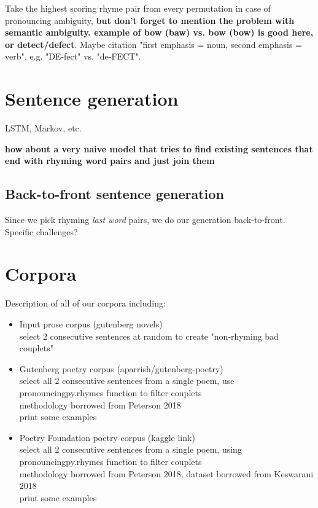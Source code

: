 \documentclass[11pt,a4paper]{article}
\begin{document}
Take the highest scoring rhyme pair from every permutation in case of pronouncing ambiguity, \textbf{but don't forget to mention the problem with semantic ambiguity. example of bow (baw) vs. bow (bow) is good here, or detect/defect}. Maybe citation "first emphasis = noun, second emphasis = verb", e.g. "DE-fect" vs. "de-FECT".

\section{Sentence generation}
\label{sec:languagegen}

LSTM, Markov, etc.

\textbf{how about a very naive model that tries to find existing sentences that end with rhyming word pairs and just join them}

\subsection{Back-to-front sentence generation}

Since we pick rhyming \textit{last word} pairs, we do our generation back-to-front. Specific challenges?

\section{Corpora}
\label{sec:corpora}

Description of all of our corpora including:

\begin{itemize}
	\item
		Input prose corpus (gutenberg novels)\\
		select 2 consecutive sentences at random to create "non-rhyming bad couplets"
	\item
		Gutenberg poetry corpus (aparrish/gutenberg-poetry)\\
		select all 2 consecutive sentences from a single poem, use pronouncingpy.rhymes function to filter couplets\\
		methodology borrowed from Peterson 2018\\
		print some examples
	\item
		Poetry Foundation poetry corpus (kaggle link)\\
		select all 2 consecutive sentences from a single poem, using pronouncingpy.rhymes function to filter couplets\\
		methodology borrowed from Peterson 2018, dataset borrowed from Keswarani 2018\\
		print some examples
\end{itemize}
\end{document}
